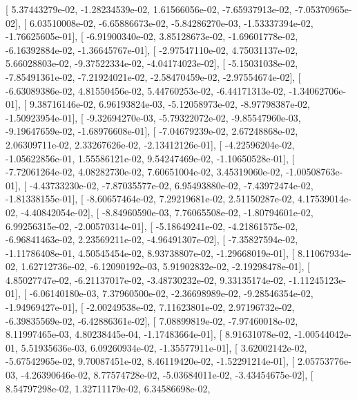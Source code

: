 \documentclass{article}
\begin{document}
       [  5.37443279e-02,  -1.28234539e-02,   1.61566056e-02,
         -7.65937913e-02,  -7.05370965e-02],
       [  6.03510008e-02,  -6.65886673e-02,  -5.84286270e-03,
         -1.53337394e-02,  -1.76625605e-01],
       [ -6.91900340e-02,   3.85128673e-02,  -1.69601778e-02,
         -6.16392884e-02,  -1.36645767e-01],
       [ -2.97547110e-02,   4.75031137e-02,   5.66028803e-02,
         -9.37522334e-02,  -4.04174023e-02],
       [ -5.15031038e-02,  -7.85491361e-02,  -7.21924021e-02,
         -2.58470459e-02,  -2.97554674e-02],
       [ -6.63089386e-02,   4.81550456e-02,   5.44760253e-02,
         -6.44171313e-02,  -1.34062706e-01],
       [  9.38716146e-02,   6.96193824e-03,  -5.12058973e-02,
         -8.97798387e-02,  -1.50923954e-01],
       [ -9.32694270e-03,  -5.79322072e-02,  -9.85547960e-03,
         -9.19647659e-02,  -1.68976608e-01],
       [ -7.04679239e-02,   2.67248868e-02,   2.06309711e-02,
          2.33267626e-02,  -2.13412126e-01],
       [ -4.22596204e-02,  -1.05622856e-01,   1.55586121e-02,
          9.54247469e-02,  -1.10650528e-01],
       [ -7.72061264e-02,   4.08282730e-02,   7.60651004e-02,
          3.45319060e-02,  -1.00508763e-01],
       [ -4.43733230e-02,  -7.87035577e-02,   6.95493880e-02,
         -7.43972474e-02,  -1.81338155e-01],
       [ -8.60657464e-02,   7.29219681e-02,   2.51150287e-02,
          4.17539014e-02,  -4.40842054e-02],
       [ -8.84960590e-03,   7.76065508e-02,  -1.80794601e-02,
          6.99256315e-02,  -2.00570314e-01],
       [ -5.18649241e-02,  -4.21861575e-02,  -6.96841463e-02,
          2.23569211e-02,  -4.96491307e-02],
       [ -7.35827594e-02,  -1.11786408e-01,   4.50545454e-02,
          8.93738807e-02,  -1.29668019e-01],
       [  8.11067934e-02,   1.62712736e-02,  -6.12090192e-03,
          5.91902832e-02,  -2.19298478e-01],
       [  4.85027747e-02,  -6.21137017e-02,  -3.48730232e-02,
          9.33135174e-02,  -1.11245123e-01],
       [ -6.06140180e-03,   7.37960500e-02,  -2.36698989e-02,
         -9.28546354e-02,  -1.94969427e-01],
       [ -2.00249538e-02,   7.11623801e-02,   2.97196732e-02,
         -6.39835569e-02,  -6.42886361e-02],
       [  7.08899819e-02,  -7.97460018e-02,   8.11997465e-03,
          4.80238445e-04,  -1.17483664e-01],
       [  8.91631078e-02,  -1.00544042e-01,   5.51935636e-03,
          6.09260934e-02,  -1.35577911e-01],
       [  3.62002142e-02,  -5.67542965e-02,   9.70087451e-02,
          8.46119420e-02,  -1.52291214e-01],
       [  2.05753776e-03,  -4.26390646e-02,   8.77574728e-02,
         -5.03684011e-02,  -3.43454675e-02],
       [  8.54797298e-02,   1.32711179e-02,   6.34586698e-02,
\end{document}
